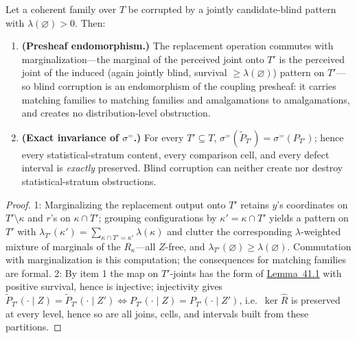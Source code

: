 \begin{thmplain}

Let a coherent family over \(T\) be corrupted by a jointly candidate-blind pattern with \(\lambda(\varnothing) > 0\). Then:

\begin{enumerate}
\def\labelenumi{\arabic{enumi}.}
\tightlist
\item
  \textbf{(Presheaf endomorphism.)} The replacement operation commutes with marginalization---\hspace{0pt}the marginal of the perceived joint onto \(T'\) is the perceived joint of the induced (again jointly blind, survival \(\ge \lambda(\varnothing)\)) pattern on \(T'\)---\hspace{0pt}so blind corruption is an endomorphism of the coupling presheaf: it carries matching families to matching families and amalgamations to amalgamations, and creates no distribution-level obstruction.
\item
  \textbf{(Exact invariance of \(\sigma^{=}\).)} For every \(T' \subseteq T\), \(\sigma^{=}(\widetilde{P}_{T'}) = \sigma^{=}(P_{T'})\); hence every statistical-stratum content, every comparison cell, and every defect interval is \emph{exactly} preserved. Blind corruption can neither create nor destroy statistical-stratum obstructions.
\end{enumerate}
\end{thmplain}

\begin{proof}

1: Marginalizing the replacement output onto \(T'\) retains \(y\)'s coordinates on \(T' \setminus \kappa\) and \(r\)'s on \(\kappa \cap T'\); grouping configurations by \(\kappa' = \kappa \cap T'\) yields a pattern on \(T'\) with \(\lambda_{T'}(\kappa') = \sum_{\kappa \cap T' = \kappa'} \lambda(\kappa)\) and clutter the corresponding \(\lambda\)-weighted mixture of marginals of the \(R_\kappa\)---\hspace{0pt}all \(Z\)-free, and \(\lambda_{T'}(\varnothing) \ge \lambda(\varnothing)\). Commutation with marginalization is this computation; the consequences for matching families are formal. 2: By item 1 the map on \(T'\)-joints has the form of \hyperlink{stmt:41.1}{Lemma~41.1} with positive survival, hence is injective; injectivity gives \(\widetilde{P}_{T'}(\cdot \mid Z) = \widetilde{P}_{T'}(\cdot \mid Z') \iff P_{T'}(\cdot \mid Z) = P_{T'}(\cdot \mid Z')\), i.e.~\(\ker \widehat{R}\) is preserved at every level, hence so are all joins, cells, and intervals built from these partitions.
\end{proof}

